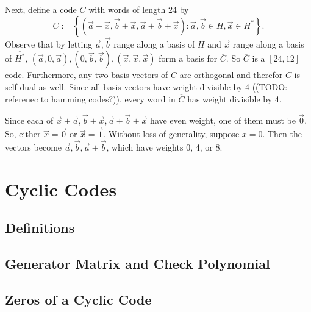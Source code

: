 \documentclass{article}
\newcommand{\extended}[1]{\overline{#1}}
\renewcommand{\=}{\equiv}
\newcommand{\set}[1]{\left\{ #1 \right\}}
\renewcommand{\v}{\vec}
\newcommand{\x}{{\v x}}
\newcommand{\TODO}[1]{(TODO: #1)}
\begin{document}
Next, define a code $\extended{C}$ with words of length 24 by
$$ \extended{C} := \set{ (\v a + \x, \v b + \x, \v a + \v b + \x) : \v a,\v b \in \extended{H}, \x \in \extended{H^*} }. $$
Observe that by letting $\v a, \v b$ range along a basis of $\extended H$ and $\x$ range along a basis of $\extended{H^*}$, $(\v a, 0, \v a), (0, \v b, \v b), (\x, \x, \x)$ form a basis for $\extended{C}$.
So $\extended{C}$ is a $[24,12]$ code.
Furthermore, any two basis vectors of $\extended{C}$ are orthogonal and therefor $\extended{C}$ is self-dual as well.
Since all basis vectors have weight divisible by 4 (\TODO{referenec to hamming codes?}), every word in $\extended{C}$ has weight divisible by 4.

Since each of $\x + \v a, \v b + \x, \v a + \v b + \x$ have even weight, one of them must be $\v 0$.
So, either $\x = \v 0$ or $\x = \v 1$.
Without loss of generality, suppose $x = 0$.
Then the vectors become $\v a, \v b, \v a + \v b$, which have weights 0, 4, or 8.


\section{Cyclic Codes}

\subsection{Definitions}

\subsection{Generator Matrix and Check Polynomial}

\subsection{Zeros of a Cyclic Code}
\end{document}
